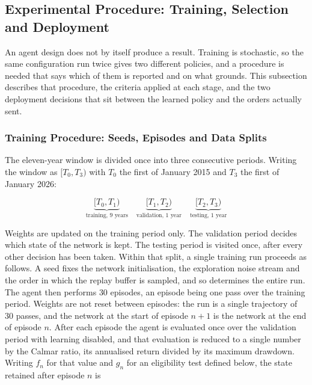 \subsection{Experimental Procedure: Training, Selection and Deployment}
\label{Subsection:ExperimentalProcedure}

An agent design does not by itself produce a result. Training is stochastic, so the same configuration run twice gives two different policies, and a procedure is needed that says which of them is reported and on what grounds. This subsection describes that procedure, the criteria applied at each stage, and the two deployment decisions that sit between the learned policy and the orders actually sent.

\subsubsection{Training Procedure: Seeds, Episodes and Data Splits}

The eleven-year window is divided once into three consecutive periods. Writing the window as $[T_0, T_3)$ with $T_0$ the first of January 2015 and $T_3$ the first of January 2026:

\begin{equation}
\underbrace{[T_0, T_1)}_{\text{training, 9 years}} \quad
\underbrace{[T_1, T_2)}_{\text{validation, 1 year}} \quad
\underbrace{[T_2, T_3)}_{\text{testing, 1 year}}
\label{Equation:Split}
\end{equation}

Weights are updated on the training period only. The validation period decides which state of the network is kept. The testing period is visited once, after every other decision has been taken. Within that split, a single training run proceeds as follows. A seed fixes the network initialisation, the exploration noise stream and the order in which the replay buffer is sampled, and so determines the entire run. The agent then performs $30$ episodes, an episode being one pass over the training period. Weights are not reset between episodes: the run is a single trajectory of $30$ passes, and the network at the start of episode $n+1$ is the network at the end of episode $n$. After each episode the agent is evaluated once over the validation period with learning disabled, and that evaluation is reduced to a single number by the Calmar ratio, its annualised return divided by its maximum drawdown. Writing $f_n$ for that value and $g_n$ for an eligibility test defined below, the state retained after episode $n$ is

